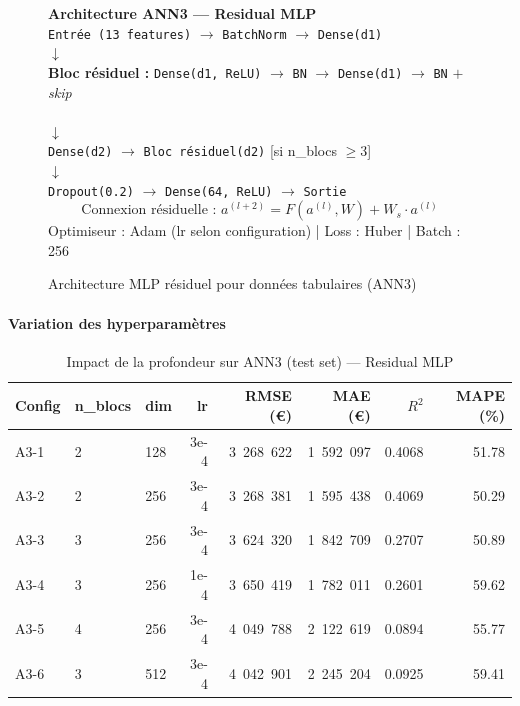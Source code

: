 \documentclass[12pt,a4paper]{article}
\begin{document}
\begin{figure}[H]
\centering
\begin{tcolorbox}[colback=lightgray,colframe=maincolor,width=0.9\textwidth,arc=2mm,boxrule=0.8pt]
\centering
\textbf{Architecture ANN3 — Residual MLP}\\[0.3cm]
\texttt{Entrée (13 features)} $\rightarrow$ \texttt{BatchNorm} $\rightarrow$ \texttt{Dense(d1)}\\
$\downarrow$\\
\textbf{Bloc résiduel :} \texttt{Dense(d1, ReLU)} $\rightarrow$ \texttt{BN}
$\rightarrow$ \texttt{Dense(d1)} $\rightarrow$ \texttt{BN} $+$ \textit{skip}\\
[répété selon n\_blocs]\\
$\downarrow$\\
\texttt{Dense(d2)} $\rightarrow$ \texttt{Bloc résiduel(d2)} [si n\_blocs $\geq 3$]\\
$\downarrow$\\
\texttt{Dropout(0.2)} $\rightarrow$ \texttt{Dense(64, ReLU)} $\rightarrow$ \texttt{Sortie}\\[0.2cm]
\[
\text{Connexion résiduelle : } a^{(l+2)} = F(a^{(l)}, W) + W_s \cdot a^{(l)}
\]
\small Optimiseur : Adam (lr selon configuration) | Loss : Huber | Batch : 256
\end{tcolorbox}
\caption{Architecture MLP résiduel pour données tabulaires (ANN3)}
\end{figure}

\paragraph{Variation des hyperparamètres}

\begin{table}[H]
\centering
\begin{tabular}{@{}lllrrrrr@{}}
\toprule
\textbf{Config} & \textbf{n\_blocs} & \textbf{dim} & \textbf{lr} &
\textbf{RMSE (€)} & \textbf{MAE (€)} & \textbf{$R^2$} & \textbf{MAPE (\%)} \\ \midrule
A3-1 & 2 & 128 & 3e-4 & 3~268~622 & 1~592~097 & 0.4068 & 51.78 \\
A3-2 & 2 & 256 & 3e-4 & 3~268~381 & 1~595~438 & 0.4069 & 50.29 \\
A3-3 & 3 & 256 & 3e-4 & 3~624~320 & 1~842~709 & 0.2707 & 50.89 \\
A3-4 & 3 & 256 & 1e-4 & 3~650~419 & 1~782~011 & 0.2601  & 59.62 \\
A3-5 & 4 & 256 & 3e-4 & 4~049~788 & 2~122~619 & 0.0894  & 55.77 \\
A3-6 & 3 & 512 & 3e-4 & 4~042~901 & 2~245~204 & 0.0925  & 59.41 \\
\end{tabular}
\caption{Impact de la profondeur sur ANN3 (test set) — Residual MLP}
\end{table}
\end{document}
